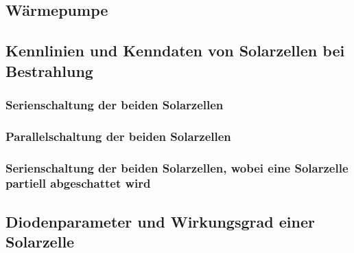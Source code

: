 \documentclass[12pt,english,ngerman]{scrartcl}
\begin{document}
\subsection{Wärmepumpe}

\subsection{Kennlinien und Kenndaten von Solarzellen bei Bestrahlung}

\subsubsection{Serienschaltung der beiden Solarzellen}

\subsubsection{Parallelschaltung der beiden Solarzellen}

\subsubsection{Serienschaltung der beiden Solarzellen, wobei eine Solarzelle partiell abgeschattet wird}

\subsection{Diodenparameter und Wirkungsgrad einer Solarzelle}

\newpage
\listoffigures
\listoftables
\end{document}
